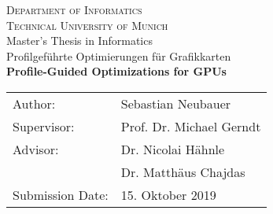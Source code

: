 \newpage
\begin{center}
  \vspace*{3cm}

  \vspace*{0.5cm}
  {\huge \textsc{Department of Informatics}}\\
  \vspace{0.25cm}
  {\Large \textsc{Technical University of Munich}} \\
  \vspace*{2cm}
  {\large Master's Thesis in Informatics} \\
  \vspace*{1cm}
  {\huge Profilgeführte Optimierungen für Grafikkarten} \\
  \vspace*{1cm}
  {\huge \textbf{Profile-Guided Optimizations for GPUs} \\}
  \vspace*{2.5cm}
  {\large
  \begin{tabular}{ll}
  Author:         & Sebastian Neubauer \\
  Supervisor:     & Prof. Dr. Michael Gerndt\\
  Advisor:        & Dr. Nicolai Hähnle\\
                  & Dr. Matthäus Chajdas\\
  Submission Date:& 15. Oktober 2019
  \end{tabular}
  }
\end{center}
